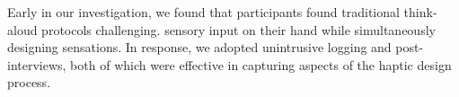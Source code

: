 %
%
%



Early in our investigation, we found that participants found traditional think-aloud protocols challenging.
 sensory input on their hand while simultaneously designing sensations.
In response, we adopted unintrusive logging and post-interviews, both of which were effective in capturing aspects of the haptic design process. 

